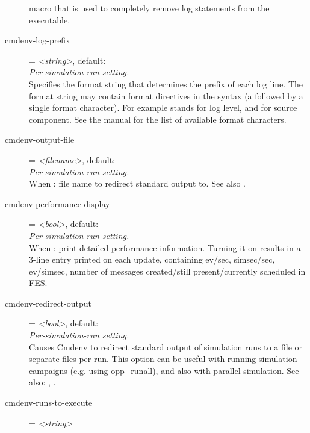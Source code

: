 \begin{description}
     macro that is used to completely remove log
    statements from the executable.
\item[cmdenv-log-prefix] = \textit{<string>}, default: \ttt{[\%l]	}\\
    \textit{Per-simulation-run setting.}\\
    Specifies the format string that determines the prefix of each log line.
    The format string may contain format directives in the syntax  (a
    \ttt{\%} followed by a single format character).  For example 
    stands for log level, and  for source component. See the manual
    for the list of available format characters.
\item[cmdenv-output-file] = \textit{<filename>}, default: \\
    \textit{Per-simulation-run setting.}\\
    When
    :
    file name to redirect standard output to. See also
    .
\item[cmdenv-performance-display] = \textit{<bool>}, default: \\
    \textit{Per-simulation-run setting.}\\
    When :
    print detailed performance information. Turning it on results in a 3-line
    entry printed on each update, containing ev/sec, simsec/sec, ev/simsec,
    number of messages created/still present/currently scheduled in FES.
\item[cmdenv-redirect-output] = \textit{<bool>}, default: \\
    \textit{Per-simulation-run setting.}\\
    Causes Cmdenv to redirect standard output of simulation runs to a file or
    separate files per run. This option can be useful with running simulation
    campaigns (e.g. using opp\_runall), and also with parallel simulation. See
    also: ,
    .
\item[cmdenv-runs-to-execute] = \textit{<string>}\\

\end{description}
